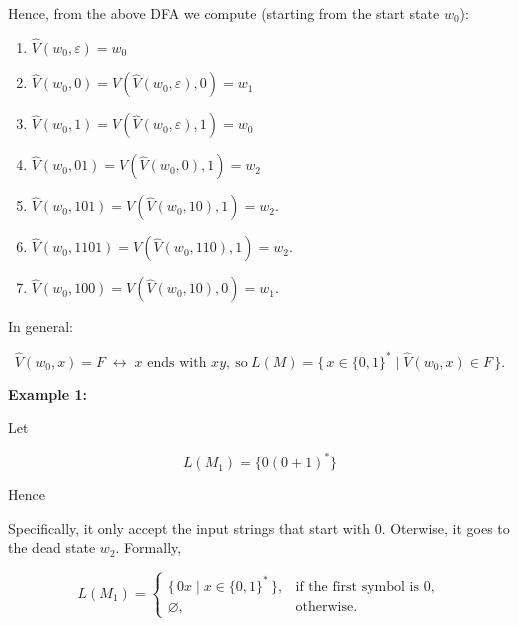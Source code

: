\documentclass[12pt,a4paper,openany]{article}
\begin{document}
Hence, from the above DFA we compute (starting from the start state $w_0$):

\begin{enumerate}
    \item $\hat{V}(w_0,\varepsilon) = w_0$
    \item $\hat{V}(w_0,0) = V(\hat{V}(w_0,\varepsilon),0) = w_1$
    \item $\hat{V}(w_0,1) = V(\hat{V}(w_0,\varepsilon),1) = w_0$
    \item $\hat{V}(w_0,01) = V(\hat{V}(w_0,0),1)  = w_2$
    \item $\hat{V}(w_0,101) = V(\hat{V}(w_0,10),1) = w_2$.
    \item $\hat{V}(w_0,1101) = V(\hat{V}(w_0,110),1) = w_2$.
    \item $\hat{V}(w_0,100) = V(\hat{V}(w_0,10),0) = w_1$.
\end{enumerate}

In general:

\[
\hat{V}(w_0, x) = F \;\leftrightarrow\; x \text{ ends with } xy,
\ \text{so} \
L(M) = \{\,x \in \{0,1\}^* \mid \hat{V}(w_0,x) \in F\,\}.
\]

\textbf{Example 1:}

Let

\[L(M_1) = \{0(0+1)^*\}\]

Hence

\begin{center}
\end{center}


Specifically, it only accept the input strings that start with 0. Oterwise, it goes to the dead state $w_2$. Formally,

\[
L(M_1)=
\begin{cases}
\{\,0x \mid x \in \{0,1\}^*\,\}, & \text{if the first symbol is } 0,\\[6pt]
\varnothing, & \text{otherwise}.
\end{cases}
\]
\end{document}
